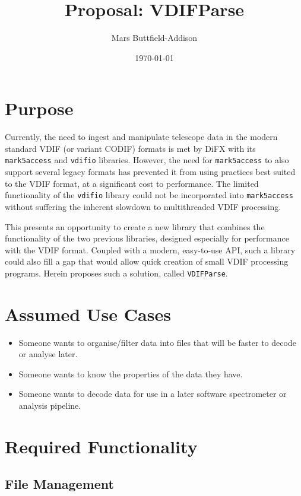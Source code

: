 \documentclass[11pt]{article}
\title{Proposal: VDIFParse}
\author{Mars Buttfield-Addison}
\date{\today}
\begin{document}
\maketitle

\section{Purpose}

Currently, the need to ingest and manipulate telescope data in the modern standard VDIF (or variant CODIF) formats is met by DiFX with its \texttt{mark5access} and \texttt{vdifio} libraries. However, the need for \texttt{mark5access} to also support several legacy formats has prevented it from using practices best suited to the VDIF format, at a significant cost to performance. The limited functionality of the \texttt{vdifio} library could not be incorporated into \texttt{mark5access} without suffering the inherent slowdown to multithreaded VDIF processing.

This presents an opportunity to create a new library that combines the functionality of the two previous libraries, designed especially for performance with the VDIF format. Coupled with a modern, easy-to-use API, such a library could also fill a gap that would allow quick creation of small VDIF processing programs. Herein proposes such a solution, called \texttt{VDIFParse}.

\section{Assumed Use Cases}

\begin{itemize}
\item Someone wants to organise/filter data into files that will be faster to decode or analyse later.
\item Someone wants to know the properties of the data they have.
\item Someone wants to decode data for use in a later software spectrometer or analysis pipeline.
\end{itemize}


\section{Required Functionality}

\subsection{File Management}
\end{document}
